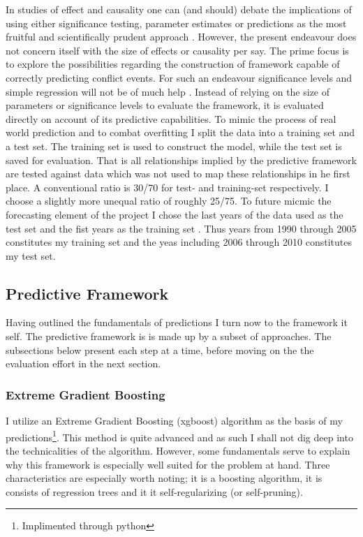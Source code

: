 \documentclass[a4paper]{article}
\begin{document}
In studies of effect and causality one can (and should) debate the implications of using either significance testing, parameter estimates or predictions as the most fruitful and scientifically prudent approach \citep{king_zeng_2001b, Goldstone_2010, Schrodt_2014}. However, the present endeavour does not concern itself with the size of effects or causality per say. The prime focus is to explore the possibilities regarding the construction of framework capable of correctly predicting conflict events. For such an endeavour significance levels and simple regression will not be of much help \citep{king_zeng_2001b, Ward_Greenhill_Bakke_2010, perry_2013, Schrodt_2014}. Instead of relying on the size of parameters or significance levels to evaluate the framework, it is evaluated directly on account of its predictive capabilities. To mimic the process of real world prediction and to combat overfitting I split the data into a training set and a test set. The training set is used to construct the model, while the test set is saved for evaluation. That is all relationships implied by the predictive framework are tested against data which was not used to map these relationships in he first place. A conventional ratio is 30/70 for test- and training-set respectively\citep{Ward_Greenhill_Bakke_2010}. I choose a slightly more unequal ratio of roughly 25/75. To future micmic the forecasting element of the project I chose the last years of the data used as the test set and the fist years as the training set \citep{Goldstone_2010}. Thus years from 1990 through 2005 constitutes my training set and the yeas including 2006 through 2010 constitutes my test set.\par

\subsection{Predictive Framework}

Having outlined the fundamentals of predictions I turn now to the framework it self. The predictive framework is is made up by a subset of approaches. The subsections below present each step at a time, before moving on the the evaluation effort in the next section.\par

\subsubsection{Extreme Gradient Boosting}

I utilize an Extreme Gradient Boosting (xgboost) algorithm as the basis of my predictions\citep{Chen_2016}\footnote{Implimented through python}. This method is quite advanced and as such I shall not dig deep into the technicalities of the algorithm. However, some fundamentals serve to explain why this framework is especially well suited for the problem at hand. Three characteristics are especially worth noting; it is a boosting algorithm, it is consists of regression trees and it it self-regularizing (or self-pruning).
\end{document}
